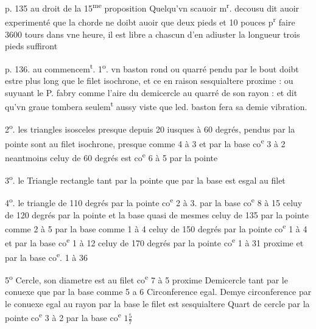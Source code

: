 \documentclass[11pt,a4paper]{article}
\begin{document}
p. 135 au droit de la 15\textsuperscript{me} proposition
Quelqu'vn scauoir m\textsuperscript{r}. decousu dit auoir experimenté que la chorde ne doibt auoir que deux pieds et 10 pouces p\textsuperscript{r} faire 3600 tours dans vne heure, il est libre a chascun d'en adiuster la longueur trois pieds suffiront

p. 136. au commencem\textsuperscript{t}.
1\textsuperscript{o}. vn baston rond ou quarré pendu par le bout doibt estre plus long que le filet isochrone, et ce en raison sesquialtere proxime : ou suyuant le P. fabry comme l'aire du demicercle au quarré de son rayon : et dit qu'vn graue tombera seulem\textsuperscript{t} aussy viste que led. baston fera sa demie vibration.

2\textsuperscript{o}. les triangles isosceles presque depuis 20 iusques à 60 degrés, pendus par la pointe sont au filet isochrone, presque comme 4 à 3 et par la base co\textsuperscript{e} 3 à 2 neantmoins celuy de 60 degrés est co\textsuperscript{e} 6 à 5 par la pointe

3\textsuperscript{o}. le Triangle rectangle tant par la pointe que par la base est esgal au filet


4\textsuperscript{o}. le triangle de 110 degrés par la pointe co\textsuperscript{e} 2 à 3. par la base co\textsuperscript{e} 8 à 15
celuy de 120 degrés par la pointe et la base quasi de mesmes
celuy de 135  par la pointe comme 2 à 5 par la base comme 1 à 4
celuy de 150 degrés par la pointe co\textsuperscript{e} 1 à 4 et par la base co\textsuperscript{e} 1 à 12
celuy de 170 degrés par la pointe co\textsuperscript{e} 1 à 31 proxime et par la base co\textsuperscript{e}. 1 à 36

5\textsuperscript{o} Cercle, son diametre est au filet co\textsuperscript{e} 7 à 5 proxime
Demicercle tant par le conuexe que par la base comme 5 a 6
Circonference egal. Demye circonference par le conuexe egal au rayon par la base le filet est sesquialtere
Quart de cercle par la pointe co\textsuperscript{e} 3 à 2 par la base co\textsuperscript{e} $1\frac{5}{7}$
\end{document}
